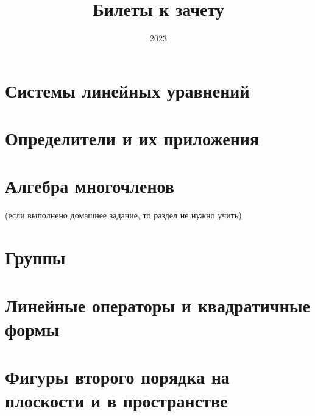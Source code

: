 \documentclass{Exams}
\author{}
\title{Билеты к зачету}
\date{2023}
\begin{document}
\subject{Алгем}
\ExamMakeTitle
\section*{Системы линейных уравнений}


\section*{Определители и их приложения}


\section*{Алгебра многочленов}
(если выполнено домашнее задание, то раздел не нужно учить)



\section*{Группы}


\section*{Линейные операторы и квадратичные формы}


\section*{Фигуры второго порядка на плоскости и в пространстве}

\end{document}
